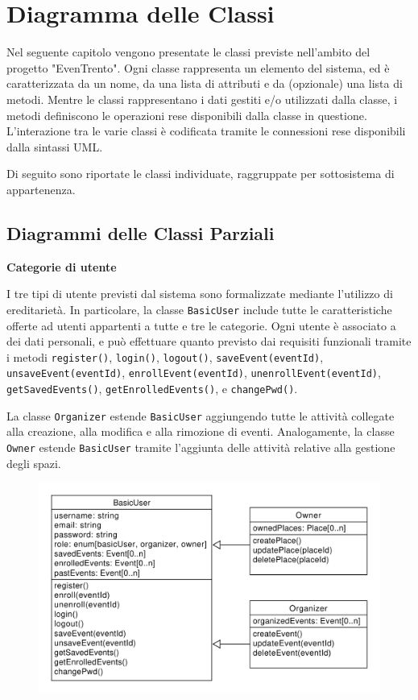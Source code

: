 \documentclass[9pt]{extarticle}
\begin{document}
\newpage

\section{Diagramma delle Classi}

Nel seguente capitolo vengono presentate le classi previste nell'ambito del progetto "EvenTrento". Ogni classe rappresenta un elemento del sistema, ed è caratterizzata da un nome, da una lista di attributi e da (opzionale) una lista di metodi.
Mentre le classi rappresentano i dati gestiti e/o utilizzati dalla classe, i metodi definiscono le operazioni rese disponibili dalla classe in questione. L'interazione tra le varie classi è codificata tramite le connessioni rese disponibili dalla sintassi UML.

Di seguito sono riportate le classi individuate, raggruppate per sottosistema di appartenenza.

\subsection{Diagrammi delle Classi Parziali}

\textbf{Categorie di utente}


I tre tipi di utente previsti dal sistema sono formalizzate mediante l'utilizzo di ereditarietà. In particolare, la classe \verb*|BasicUser| include tutte le caratteristiche offerte ad utenti appartenti a tutte e tre le categorie. Ogni utente è associato a dei dati personali, e può effettuare quanto previsto dai requisiti funzionali tramite i metodi \verb*|register()|, \verb*|login()|, \verb*|logout()|, \verb*|saveEvent(eventId)|, \verb*|unsaveEvent(eventId)|, \verb*|enrollEvent(eventId)|, \verb*|unenrollEvent(eventId)|, \verb*|getSavedEvents()|, \verb*|getEnrolledEvents()|, e \verb*|changePwd()|.


La classe \verb*|Organizer| estende \verb*|BasicUser| aggiungendo tutte le attività collegate alla creazione, alla modifica e alla rimozione di eventi. Analogamente, la classe \verb*|Owner| estende \verb*|BasicUser| tramite l'aggiunta delle attività relative alla gestione degli spazi.

\begin{figure}[!htb]
	\centering
	\includegraphics[width=.8\linewidth]{./images/classDiagramUsers.pdf}
		\caption{}
	\label{fig:classDiagramUsers}
\end{figure}
\end{document}

